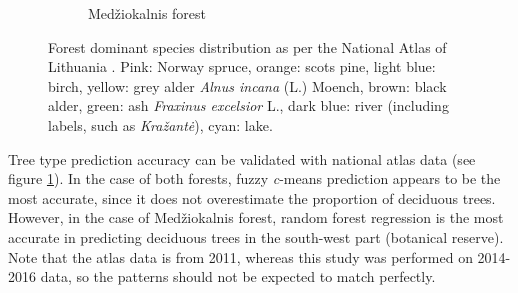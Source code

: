 \documentclass[a4paper,12pt]{scrbook}
\begin{document}
\begin{figure}
\begin{subfigure}[b]{0.48\textwidth}
    \caption{Med\v{z}iokalnis forest}
  \end{subfigure}
  \caption{Forest dominant species distribution as per the National Atlas of Lithuania \citep{treeatlas2011}. Pink: Norway spruce, orange: scots pine, light blue: birch, yellow: grey alder \textit{Alnus incana} (L.) Moench, brown: black alder, green: ash \textit{Fraxinus excelsior} L., dark blue: river (including labels, such as \textit{Kra\v{z}ant\.{e}}), cyan: lake.}
  \label{fig-atlas-forest}
\end{figure}

Tree type prediction accuracy can be validated with national atlas data (see figure \ref{fig-atlas-forest}). In the case of both forests, fuzzy \textit{c}-means prediction appears to be the most accurate, since it does not overestimate the proportion of deciduous trees. However, in the case of Med\v{z}iokalnis forest, random forest regression is the most accurate in predicting deciduous trees in the south-west part (botanical reserve). Note that the atlas data is from 2011, whereas this study was performed on 2014-2016 data, so the patterns should not be expected to match perfectly.
\end{document}

